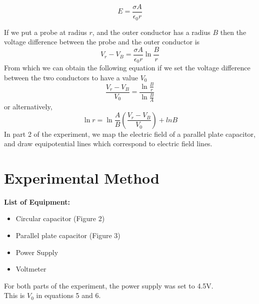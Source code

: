 \documentclass[letterpaper]{article}
\begin{document}
\begin{equation}
  E=\frac{\sigma A}{\epsilon_0 r}
\end{equation}

If we put a probe at radius $r$, and the outer conductor has a radius $B$ then the voltage
difference between the probe and the outer conductor is
\begin{equation}
  V_r-V_B=\frac{\sigma A}{\epsilon_0 r} \ln{\frac{B}{r}}
\end{equation}
From which we can obtain the following equation if we set the voltage difference between the two conductors to have a value $V_0$
\begin{equation}
  \frac{V_r-V_B}{V_0}=\frac{\ln{\frac{B}{r}}}{\ln{\frac{B}{A}}}
\end{equation}
or alternatively,
\begin{equation}
  \ln{r} =\ln{\frac{A}{B}}(\frac{V_r-V_B}{V_0}) + ln{B}
\end{equation}
In part 2 of the experiment, we map the electric field of a parallel plate capacitor, and draw equipotential lines
which correspond to electric field lines.


\section{Experimental Method}

\textbf{List of Equipment:}
\begin{itemize}
  \item Circular capacitor (Figure 2)
  \item Parallel plate capacitor (Figure 3)
  \item Power Supply
  \item Voltmeter
\end{itemize}
For both parts of the experiment, the power supply was set to 4.5V. \\This is $V_0$ in equations 5 and 6.
\newpage
\end{document}

